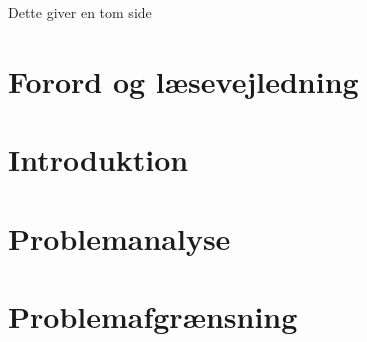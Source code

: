 

\raggedbottom



\frontmatter


\clearpage
\thispagestyle{empty}
{\color{white}Dette giver en tom side}
\clearpage

 \clearpage 


\chapter*{Forord og læsevejledning}\vspace{-.75cm}

\newpage

\tableofcontents* 

\mainmatter

\chapter{Introduktion}\vspace{-.75cm} \label{introduktion}


%

\chapter{Problemanalyse}\vspace{-.75cm} \label{problemanalysen}





\chapter{Problemafgrænsning}\vspace{-.75cm}



